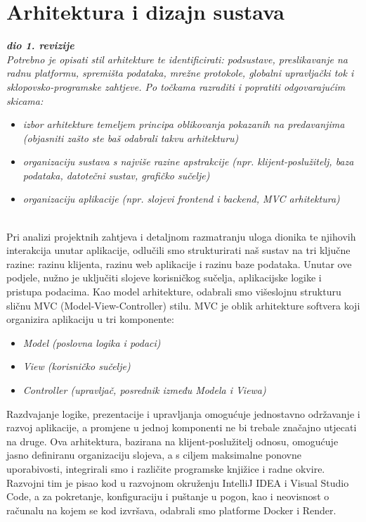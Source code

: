 \chapter{Arhitektura i dizajn sustava}

\textbf{\textit{dio 1. revizije}}\\

\textit{ Potrebno je opisati stil arhitekture te identificirati: podsustave, preslikavanje na radnu platformu, spremišta podataka, mrežne protokole, globalni upravljački tok i sklopovsko-programske zahtjeve. Po točkama razraditi i popratiti odgovarajućim skicama:}
\begin{itemize}
	\item 	\textit{izbor arhitekture temeljem principa oblikovanja pokazanih na predavanjima (objasniti zašto ste baš odabrali takvu arhitekturu)}
	\item 	\textit{organizaciju sustava s najviše razine apstrakcije (npr. klijent-poslužitelj, baza podataka, datotečni sustav, grafičko sučelje)}
	\item 	\textit{organizaciju aplikacije (npr. slojevi frontend i backend, MVC arhitektura) }
\end{itemize}


\noindent \\Pri analizi projektnih zahtjeva i detaljnom razmatranju uloga dionika te njihovih interakcija unutar aplikacije, odlučili smo strukturirati naš sustav na tri ključne razine: razinu klijenta, razinu web aplikacije i razinu baze podataka. Unutar ove podjele, nužno je uključiti slojeve korisničkog sučelja, aplikacijske logike i pristupa podacima. Kao model arhitekture, odabrali smo višeslojnu strukturu sličnu MVC (Model-View-Controller) stilu. MVC je oblik arhitekture softvera koji organizira aplikaciju u tri komponente:

\begin{itemize}
	\item 	\textit{Model (poslovna logika i podaci)}
	\item 	\textit{View (korisničko sučelje)}
	\item 	\textit{Controller (upravljač, posrednik između Modela i Viewa)}
\end{itemize}
\noindent Razdvajanje logike, prezentacije i upravljanja omogućuje jednostavno održavanje i razvoj aplikacije, a promjene u jednoj komponenti ne bi trebale značajno utjecati na druge. Ova arhitektura, bazirana na klijent-poslužitelj odnosu, omogućuje jasno definiranu organizaciju slojeva, a s ciljem maksimalne ponovne uporabivosti, integrirali smo i različite programske knjižice i radne okvire. Razvojni tim je pisao kod u razvojnom okruženju IntelliJ IDEA i Visual Studio Code, a za pokretanje, konfiguraciju i puštanje u pogon, kao i neovisnost o računalu na kojem se kod izvršava, odabrali smo platforme Docker i Render.


